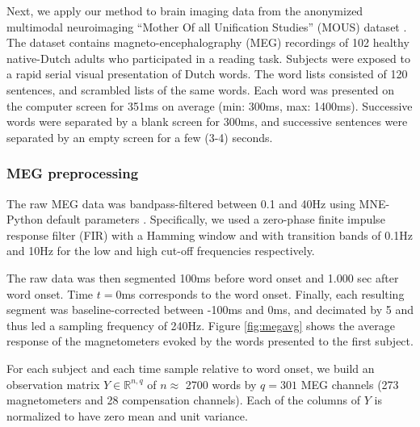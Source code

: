 
Next, we apply our method to brain imaging data from the anonymized multimodal
neuroimaging ``Mother Of all Unification Studies'' (MOUS) dataset
\citep{schoffelen2019204}.  The dataset contains magneto-encephalography (MEG)
recordings of 102 healthy native-Dutch adults who participated in a reading
task.
%
Subjects were exposed to a rapid serial visual presentation of Dutch words. The
word lists consisted of 120 sentences, and scrambled lists of the same words.
Each word was presented on the computer screen for 351ms on average (min: 300ms,
max: 1400ms).  Successive words were separated by a blank screen for 300ms, and
successive sentences were separated by an empty screen for a few (3-4) seconds.

\subsubsection{MEG preprocessing}

The raw MEG data was bandpass-filtered between 0.1 and 40Hz using MNE-Python
default parameters \citep{gramfort2013meg, gramfort2014mne}. Specifically, we used a zero-phase finite impulse
response filter (FIR) with a Hamming window and with transition bands of 0.1Hz
and 10Hz for the low and high cut-off frequencies respectively.

The raw data was then segmented 100ms before word onset and 1.000 sec after
word onset. Time $t=0$ms corresponds to the word onset. Finally, each resulting
segment was baseline-corrected between -100ms and 0ms, and decimated by 5 and
thus led a sampling frequency of 240Hz. Figure \ref{fig:megavg} shows
the average response of the magnetometers evoked by the words presented to the
first subject.

For each subject and each time sample relative to word onset, we
build an observation matrix $Y \in \mathbb{R}^{n, q}$ of $n\approx$ 2700 words
by $q=301$ MEG channels (273 magnetometers and 28 compensation channels). Each
of the columns of $Y$ is normalized to have zero mean and unit variance.

